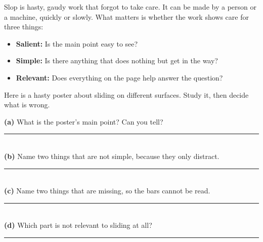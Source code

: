 \clearpage
\clearpage
\thispagestyle{fancy}\label{slop}
Slop is hasty, gaudy work that forgot to take care. It can be made by a person or a machine, quickly or slowly. What matters is whether the work shows care for three things:
\begin{itemize}[leftmargin=1.6em]
\item \textbf{Salient:} Is the main point easy to see?
\item \textbf{Simple:} Is there anything that does nothing but get in the way?
\item \textbf{Relevant:} Does everything on the page help answer the question?
\end{itemize}

Here is a hasty poster about sliding on different surfaces. Study it, then decide what is wrong.

\begin{center}
\end{center}

\begin{slopbox}
\textbf{(a)} What is the poster's main point? Can you tell?\\[3pt]\rule{\linewidth}{0.5pt}\\[6pt]
\textbf{(b)} Name two things that are not simple, because they only distract.\\[3pt]\rule{\linewidth}{0.5pt}\\[6pt]
\textbf{(c)} Name two things that are missing, so the bars cannot be read.\\[3pt]\rule{\linewidth}{0.5pt}\\[6pt]
\textbf{(d)} Which part is not relevant to sliding at all?\\[3pt]\rule{\linewidth}{0.5pt}
\end{slopbox}

